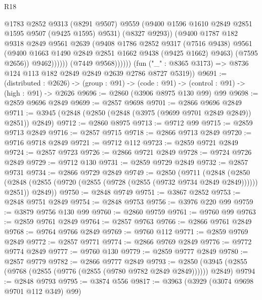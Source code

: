 \begin{lexlean}{R18}
\begin{coremodule}
                            @1783
                            @2852
                            @9313
                            (@8291 @9507)
                            @9559
                            (@9400 @1596 @1610 @2849 @2851 @1595 @9507 (@9425 @1595) @9531)
                            (@8327 @9293))
                          (@9400
                            @1787
                            @182
                            @9318
                            @2849
                            @9561
                            @2639
                            (@9408
                              @1786
                              @2852
                              @9317
                              (@7516 @9438)
                              @9561
                              (@9400 @1663 @1490 @2849 @2851 @1662 @9438 (@9425 @1662) @9463)
                              (@7595 @2656))
                            @9462))))))
                (@7449 @9568))))))
      (fun ("_" : @8365 @3173) => @8736 @124 @113 @182 @2849 @2849 @2639 @2786 @8727 @5319))
@9691 := (distributed : @2626) ->
  (group : @91) -> (code : @91) -> (control : @91) -> (high : @91) -> @2626
@9696 := @2860 (@3906 @8975 @130 @99) @99
@9698 := @2859 @9696 @2849
@9699 := @2857 @9698
@9701 := @2866 @9696 @2849
@9711 := @3945 (@2848 (@2850 (@2848 (@3975 (@9699 @9701 @2849 @2849)) @2851)) @2849)
@9712 := @2860 @8975
@9713 := @9712 @99
@9715 := @2859 @9713 @2849
@9716 := @2857 @9715
@9718 := @2866 @9713 @2849
@9720 := @9716 @9718 @2849
@9721 := @9712 @112
@9723 := @2859 @9721 @2849
@9724 := @2857 @9723
@9726 := @2866 @9721 @2849
@9728 := @9724 @9726 @2849
@9729 := @9712 @130
@9731 := @2859 @9729 @2849
@9732 := @2857 @9731
@9734 := @2866 @9729 @2849
@9749 := @2850
    (@9711
      (@2848
        (@2850 (@2848 (@2855 (@9720 (@2855 (@9728 (@2855 (@9732 @9734 @2849 @2849)))))) @2851))
        @2849))
@9750 := @2848 @9749
@9751 := @3867 @2852
@9753 := @2848 @9751 @2849
@9754 := @2848 @9753
@9756 := @3976 @220 @99
@9759 := @3879 @9756 @130 @99
@9760 := @2860 @9759
@9761 := @9760 @99
@9763 := @2859 @9761 @2849
@9764 := @2857 @9763
@9766 := @2866 @9761 @2849
@9768 := @9764 @9766 @2849
@9769 := @9760 @112
@9771 := @2859 @9769 @2849
@9772 := @2857 @9771
@9774 := @2866 @9769 @2849
@9776 := @9772 @9774 @2849
@9777 := @9760 @130
@9779 := @2859 @9777 @2849
@9780 := @2857 @9779
@9782 := @2866 @9777 @2849
@9793 := @2850 (@3945 (@2855 (@9768 (@2855 (@9776 (@2855 (@9780 @9782 @2849 @2849)))))) @2849)
@9794 := @2848 @9793
@9795 := @3874 @556
@9817 := @3963
    (@3929 (@3074 @9698 @9701 @112 @349) @99)

\end{coremodule}
\end{lexlean}
